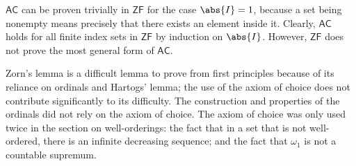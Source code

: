 $\mathsf{AC}$ can be proven trivially in $\mathsf{ZF}$ for the case $\abs{I} = 1$, because a set being nonempty means precisely that there exists an element inside it.
Clearly, $\mathsf{AC}$ holds for all finite index sets in $\mathsf{ZF}$ by induction on $\abs{I}$.
However, $\mathsf{ZF}$ does not prove the most general form of $\mathsf{AC}$.

Zorn's lemma is a difficult lemma to prove from first principles because of its reliance on ordinals and Hartogs' lemma; the use of the axiom of choice does not contribute significantly to its difficulty.
The construction and properties of the ordinals did not rely on the axiom of choice.
The axiom of choice was only used twice in the section on well-orderings: the fact that in a set that is not well-ordered, there is an infinite decreasing sequence; and the fact that $\omega_1$ is not a countable supremum.

